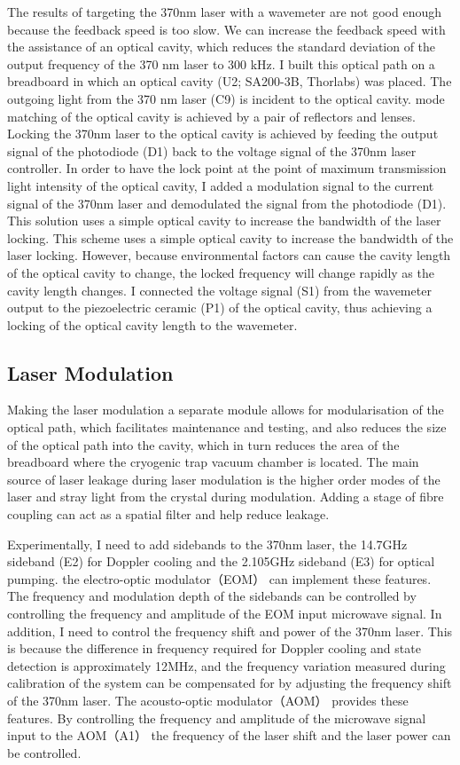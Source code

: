 The results of targeting the 370nm laser with a wavemeter are not good enough because the feedback speed is too slow. We can increase the feedback speed with the assistance of an optical cavity, which reduces the standard deviation of the output frequency of the 370 nm laser to 300 kHz. I built this optical path on a breadboard in which an optical cavity (U2; SA200-3B, Thorlabs) was placed. The outgoing light from the 370 nm laser (C9) is incident to the optical cavity. mode matching of the optical cavity is achieved by a pair of reflectors and lenses. Locking the 370nm laser to the optical cavity is achieved by feeding the output signal of the photodiode (D1) back to the voltage signal of the 370nm laser controller. In order to have the lock point at the point of maximum transmission light intensity of the optical cavity, I added a modulation signal to the current signal of the 370nm laser and demodulated the signal from the photodiode (D1). This solution uses a simple optical cavity to increase the bandwidth of the laser locking. This scheme uses a simple optical cavity to increase the bandwidth of the laser locking. However, because environmental factors can cause the cavity length of the optical cavity to change, the locked frequency will change rapidly as the cavity length changes. I connected the voltage signal (S1) from the wavemeter output to the piezoelectric ceramic (P1) of the optical cavity, thus achieving a locking of the optical cavity length to the wavemeter.

\subsection{Laser Modulation}

Making the laser modulation a separate module allows for modularisation of the optical path, which facilitates maintenance and testing, and also reduces the size of the optical path into the cavity, which in turn reduces the area of the breadboard where the cryogenic trap vacuum chamber is located. The main source of laser leakage during laser modulation is the higher order modes of the laser and stray light from the crystal during modulation. Adding a stage of fibre coupling can act as a spatial filter and help reduce leakage.

Experimentally, I need to add sidebands to the 370nm laser, the 14.7GHz sideband (E2) for Doppler cooling and the 2.105GHz sideband (E3) for optical pumping. the electro-optic modulator（EOM） can implement these features. The frequency and modulation depth of the sidebands can be controlled by controlling the frequency and amplitude of the EOM input microwave signal. In addition, I need to control the frequency shift and power of the 370nm laser. This is because the difference in frequency required for Doppler cooling and state detection is approximately 12MHz, and the frequency variation measured during calibration of the system can be compensated for by adjusting the frequency shift of the 370nm laser. The acousto-optic modulator（AOM） provides these features. By controlling the frequency and amplitude of the microwave signal input to the AOM（A1） the frequency of the laser shift and the laser power can be controlled.

